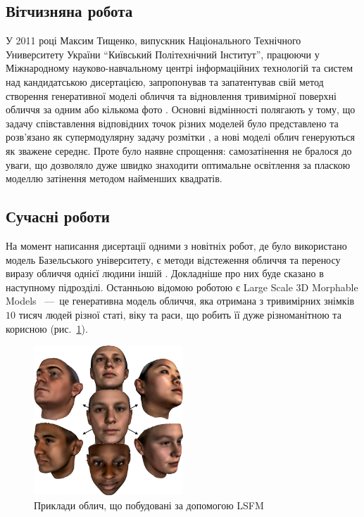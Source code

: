 \subsection{Вітчизняна робота}

У 2011 році Максим Тищенко,
випускник Національного Технічного Университету України
``Київський Політехнічний Інститут'',
працюючи у Міжнародному науково-навчальному центрі
інформаційних технологій та систем над кандидатською дисертацією,
запропонував та запатентував
свій метод створення генеративної моделі обличчя та відновлення
тривимірної поверхні обличчя за одним або кількома фото \cite{tyshchenko:2011}.
Основні відмінності полягають у тому,
що задачу співставлення відповідних точок різних моделей
було представлено та розв'язано як супермодулярну
задачу розмітки \cite{Lovasz1983},
а нові моделі облич генеруються як зважене середнє.
Проте було наявне спрощення: самозатінення не бралося до уваги,
що дозволяло дуже швидко знаходити оптимальне освітлення
за пласкою моделлю затінення методом найменших квадратів.

\subsection{Сучасні роботи}

На момент написання дисертації одними з новітніх робот,
де було використано модель Базельського університету,
є методи відстеження обличчя \cite{Saito2016}
та переносу виразу обличчя однієї людини іншій \cite{thies2016face}.
Докладніше про них буде сказано в наступному підрозділі.
Останньою відомою роботою
є Large Scale 3D Morphable Models \cite{Booth:2017}~---~це
генеративна модель обличчя, яка отримана з тривимірних знімків $10$ тисяч людей
різної статі, віку та раси, що робить її дуже різноманітною та корисною
(рис.~\ref{fig:problems:lsfm}).

\begin{figure}[h]
  \centering
    \includegraphics[width=0.5\textwidth]{images/lsfm}
  \caption{Приклади облич, що побудовані за допомогою LSFM}
  \label{fig:problems:lsfm}
\end{figure}
